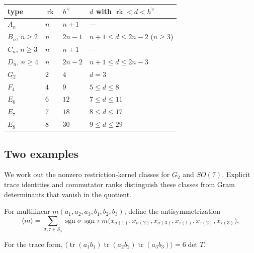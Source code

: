 \documentclass[11pt]{article}
\numberwithin{equation}{section}
\numberwithin{figure}{section}
\numberwithin{table}{section}
\begin{document}
{\small\renewcommand{\arraystretch}{1.25}\setlength{\tabcolsep}{4pt}
\begin{xltabular}{\linewidth}{@{}lll>{\raggedright\arraybackslash}X@{}}
\toprule
type & $\operatorname{rk}$ & $h^\vee$ & $d$ with $\operatorname{rk}<d<h^\vee$\\
\midrule\endhead
$A_n$ & $n$ & $n+1$ & ---\\
$B_n$, $n\ge2$ & $n$ & $2n-1$ & $n+1\le d\le2n-2$ ($n\ge3$)\\
$C_n$, $n\ge3$ & $n$ & $n+1$ & ---\\
$D_n$, $n\ge4$ & $n$ & $2n-2$ & $n+1\le d\le2n-3$\\
$G_2$ & $2$ & $4$ & $d=3$\\
$F_4$ & $4$ & $9$ & $5\le d\le8$\\
$E_6$ & $6$ & $12$ & $7\le d\le11$\\
$E_7$ & $7$ & $18$ & $8\le d\le17$\\
$E_8$ & $8$ & $30$ & $9\le d\le29$\\
\bottomrule
\end{xltabular}}

\subsection{Two examples}\label{sec-E-gram-examples}

We work out the nonzero restriction-kernel classes for $G_2$ and $SO(7)$. Explicit trace identities and commutator ranks distinguish these classes from Gram determinants that vanish in the quotient.

For multilinear $m(a_1,a_2,a_3,b_1,b_2,b_3)$, define the antisymmetrization
\begin{equation}\label{eq-E-antisym}
\langle m\rangle=\sum_{\sigma,\tau\in S_3}\operatorname{sgn}\sigma\,\operatorname{sgn}\tau\;m\bigl(x_{\sigma(1)},x_{\sigma(2)},x_{\sigma(3)},x_{\tau(1)},x_{\tau(2)},x_{\tau(3)}\bigr),
\end{equation}

For the trace form, $\langle\operatorname{tr}(a_1b_1)\operatorname{tr}(a_2b_2)\operatorname{tr}(a_3b_3)\rangle=6\det T$.
\end{document}
